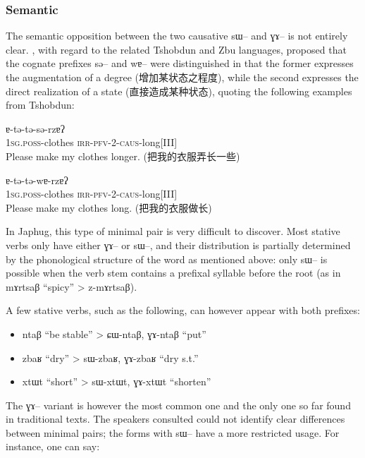 \documentclass[oldfontcommands,oneside,a4paper,11pt]{memoir}
\newcommand{\ipa}[1]{{\phon #1}} %
\newcommand{\zh}[1]{{\cn #1}}
\newcommand{\caus}{\textsc{caus}}
\newcommand{\irr}{\textsc{irr}}
\newcommand{\pfv}{\textsc{pfv}}
\newcommand{\poss}{\textsc{poss}}
\newcommand{\sg}{\textsc{sg}}
\begin{document}
\subsubsection{Semantic} \label{subsub:caus-g:semantics}
The semantic opposition between the two causative \ipa{sɯ}-- and \ipa{ɣɤ}-- is not entirely clear. \citet{jackson06paisheng}, with regard to the related Tshobdun and Zbu languages, proposed that the cognate prefixes \ipa{sə}-- and \ipa{wɐ}-- were distinguished in that the former expresses the \ipa{augmentation of a degree} (\zh{增加某状态之程度}), while the second expresses the \ipa{direct realization of a state}  (\zh{直接造成某种状态}), quoting the following examples from Tshobdun:
 \begin{exe}
\ex 
\gll  \ipa{ɐ́-ⁿge}  \ipa{ɐ-tə-tə-sə-rzɐʔ} \\
   1\sg{}.\poss{}-clothes \irr{}-\pfv{}-2-\caus{}-long[III] \\
 \glt    Please make my clothes longer. (\zh{把我的衣服弄长一些})
  \begin{exe}
   \end{exe}
   \ex 
\gll  \ipa{ɐ́-ⁿge}  \ipa{ɐ-tə-tə-wɐ-rzɐʔ} \\
     1\sg{}.\poss{}-clothes \irr{}-\pfv{}-2-\caus{}-long[III] \\
 \glt    Please make my clothes long. (\zh{把我的衣服做长})
   \end{exe}

In Japhug, this type of minimal pair is very difficult to discover. Most stative verbs only have either \ipa{ɣɤ}-- or \ipa{sɯ}--, and their distribution is partially determined by the phonological structure of the word as mentioned above: only \ipa{sɯ}-- is possible when the verb stem contains a prefixal syllable before the root (as in \ipa{mɤrtsaβ} ``spicy'' >  \ipa{z-mɤrtsaβ}). 

A few stative verbs, such as the following, can however appear with both prefixes:
\begin{itemize}
\item \ipa{ntaβ} ``be stable'' > \ipa{ɕɯ-ntaβ}, \ipa{ɣɤ-ntaβ} ``put''
\item \ipa{zbaʁ} ``dry'' > \ipa{sɯ-zbaʁ}, \ipa{ɣɤ-zbaʁ} ``dry s.t.''
\item \ipa{xtɯt} ``short'' > \ipa{sɯ-xtɯt}, \ipa{ɣɤ-xtɯt} ``shorten''
\end{itemize}
The \ipa{ɣɤ}-- variant is however  the most common one and the only one so far found in traditional texts. The speakers consulted could not identify  clear differences between minimal pairs; the forms with \ipa{sɯ}-- have a more restricted usage. For instance, one can say:
\end{document}
